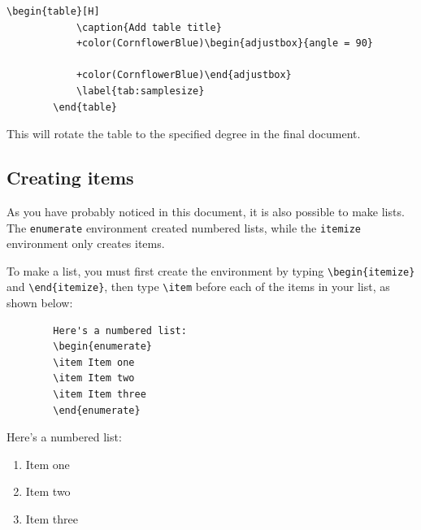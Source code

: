 \documentclass[12pts]{article}
\begin{document}
	\begin{minipage}{\textwidth}
		\begin{Verbatim}[commandchars=+\(\)]
		\begin{table}[H]
			\caption{Add table title}
			+color(CornflowerBlue)\begin{adjustbox}{angle = 90} 
				
			+color(CornflowerBlue)\end{adjustbox}
			\label{tab:samplesize}
		\end{table}
		\end{Verbatim}
	\end{minipage}
	
	
	This will rotate the table to the specified degree in the final document. 
	
	\subsection{Creating items}
	
	As you have probably noticed in this document, it is also possible to make lists. The \texttt{enumerate} environment created numbered lists, while the \texttt{itemize} environment only creates items.
	
	To make a list, you must first create the environment by typing \verb|\begin{itemize}| and \verb|\end{itemize}|, then type \verb|\item| before each of the items in your list, as shown below:
	
	\begin{multicols}{2}
		\begin{Verbatim}
		Here's a numbered list:
		\begin{enumerate}
		\item Item one
		\item Item two
		\item Item three
		\end{enumerate}
		\end{Verbatim}
		
		\columnbreak	
		
		Here's a numbered list:
		\begin{enumerate}
			\item Item one
			\item Item two
			\item Item three
		\end{enumerate}
	\end{multicols}
	
\end{document}

